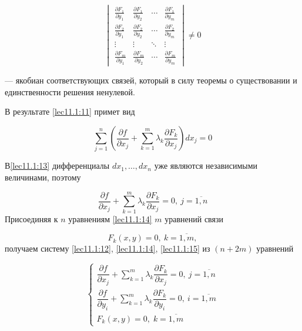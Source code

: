 \documentclass[../../main.tex]{subfiles}
\begin{document}
	\[
	\begin{vmatrix}
	\frac{\partial F_1}{\partial y_1} & \frac{\partial F_1}{\partial y_2}
	& \cdots & \frac{\partial F_1}{\partial y_m} \\
	\frac{\partial F_2}{\partial y_1} & \frac{\partial F_2}{\partial y_2} 
	& \cdots & \frac{\partial F_2}{\partial y_m} \\
	\vdots  & \vdots  & \ddots & \vdots  \\
	\frac{\partial F_m}{\partial y_1} & \frac{\partial F_m}{\partial y_2}
	& \cdots & \frac{\partial F_m}{\partial y_m}
	\end{vmatrix} \ne 0
	\]
	
    --- якобиан соответствующих связей, который в силу теоремы о существовании
	и единственности решения ненулевой.
	
	В результате \eqref{lec11.1:11} примет вид
	
	\begin{equation}
	\label{lec11.1:13}
	\sum\limits_{j=1}^{n}\left(  \dfrac{\partial f }{\partial x_j} + 
	\sum\limits_{k=1}^{m} \lambda_k\dfrac{\partial F_k }{\partial x_j}  
	\right) d x_j =0 
	\end{equation}
	
	В\eqref{lec11.1:13} дифференциалы
	$d x_1,\ldots,d x_n$ уже являются независимыми величинами, поэтому
	
	\begin{equation}
	\label{lec11.1:14}
	\dfrac{\partial f }{\partial x_j} + \sum\limits_{k=1}^{m}
	\lambda_k \dfrac{\partial F_k }{\partial x_j} = 0,\ j = \overline{1, n}
	\end{equation}
	Присоединяя к $n$ уравнениям \eqref{lec11.1:14} $m$
	уравнений связи
	
	\begin{equation}
	 \label{lec11.1:15}
	 F_k(x, y) = 0,\ k = \overline{1, m},
	\end{equation}
	получаем систему
	\eqref{lec11.1:12},
	\eqref{lec11.1:14},
	\eqref{lec11.1:15}
	из $ \left( n + 2m \right) $ уравнений
	
	\[
	\begin{cases}
	\dfrac{\partial f }{\partial x_j} + \sum\limits_{k=1}^{m}
	\lambda_k \dfrac{\partial F_k }{\partial x_j} = 0,\ j = \overline{1, n}\\
	\dfrac{\partial f}{\partial y_i} + \sum\limits_{k = 1}^m \lambda_k 
	\dfrac{\partial F_k}{\partial y_i} = 0,\ i = \overline{1,m} \\
	F_k\left( x, y \right) = 0,\; k = \overline{1, m}
	\end{cases}
	\]
	
\end{document}
